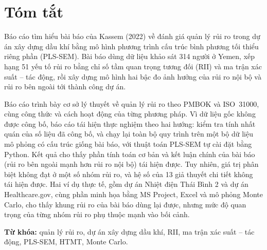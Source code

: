 \chapter*{Tóm tắt}

Báo cáo tìm hiểu bài báo của Kassem (2022) về đánh giá quản lý rủi ro trong dự án xây dựng dầu khí bằng mô hình phương trình cấu trúc bình phương tối thiểu riêng phần (PLS-SEM). Bài báo dùng dữ liệu khảo sát 314 người ở Yemen, xếp hạng 51 yếu tố rủi ro bằng chỉ số tầm quan trọng tương đối (RII) và ma trận xác suất -- tác động, rồi xây dựng mô hình hai bậc đo ảnh hưởng của rủi ro nội bộ và rủi ro bên ngoài tới thành công dự án.

Báo cáo trình bày cơ sở lý thuyết về quản lý rủi ro theo PMBOK và ISO~31000, cùng công thức và cách hoạt động của từng phương pháp. Vì dữ liệu gốc không được công bố, báo cáo tái hiện thực nghiệm theo hai hướng: kiểm tra tính nhất quán của số liệu đã công bố, và chạy lại toàn bộ quy trình trên một bộ dữ liệu mô phỏng có cấu trúc giống bài báo, với thuật toán PLS-SEM tự cài đặt bằng Python. Kết quả cho thấy phần tính toán cơ bản và kết luận chính của bài báo (rủi ro bên ngoài mạnh hơn rủi ro nội bộ) tái hiện được. Tuy nhiên, giá trị phân biệt không đạt ở một số nhóm rủi ro, và hệ số của 13 giả thuyết chi tiết không tái hiện được. Hai ví dụ thực tế, gồm dự án Nhiệt điện Thái Bình 2 và dự án Healthcare.gov, cùng phần minh họa bằng MS Project, Excel và mô phỏng Monte Carlo, cho thấy khung rủi ro của bài báo dùng lại được, nhưng mức độ quan trọng của từng nhóm rủi ro phụ thuộc mạnh vào bối cảnh.

\textbf{Từ khóa:} quản lý rủi ro, dự án xây dựng dầu khí, RII, ma trận xác suất -- tác động, PLS-SEM, HTMT, Monte Carlo.

\clearpage

